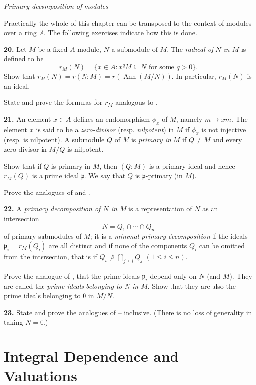 \medskip
\noindent\emph{Primary decomposition of modules}

Practically the whole of this chapter can be transposed to the context of
modules over a ring $A$.  The following exercises indicate how this is done.

\medskip
\noindent\textbf{20.} Let $M$ be a fixed $A$-module, $N$ a submodule of $M$.  The \emph{radical of $N$ in $M$} is
defined to be
\[
r_M(N)=\{x\in A:x^qM\subseteq N\text{ for some }q>0\}.
\]
Show that $r_M(N)=r(N:M)=r(\operatorname{Ann}(M/N))$.  In particular, $r_M(N)$ is an
ideal.

State and prove the formulas for $r_M$ analogous to .

\medskip
\noindent\textbf{21.} An element $x\in A$ defines an endomorphism $\phi_x$ of $M$, namely $m\longmapsto xm$.  The
element $x$ is said to be a \emph{zero-divisor} (resp. \emph{nilpotent}) in $M$ if $\phi_x$ is not injective
(resp. is nilpotent).  A submodule $Q$ of $M$ is \emph{primary in $M$} if $Q\ne M$ and every
zero-divisor in $M/Q$ is nilpotent.

Show that if $Q$ is primary in $M$, then $(Q:M)$ is a primary ideal and hence
$r_M(Q)$ is a prime ideal $\mathfrak p$.  We say that $Q$ is $\mathfrak p$-primary (in $M$).

Prove the analogues of  and .

\medskip
\noindent\textbf{22.} A \emph{primary decomposition of $N$ in $M$} is a representation of $N$ as an intersection
\[
N=Q_1\cap\cdots\cap Q_n
\]
of primary submodules of $M$; it is a \emph{minimal primary decomposition} if the ideals
$\mathfrak p_i=r_M(Q_i)$ are all distinct and if none of the components $Q_i$ can be omitted
from the intersection, that is if $Q_i\nsupseteq\bigcap_{j\ne i}Q_j$ $(1\leq i\leq n)$.

Prove the analogue of , that the prime ideals $\mathfrak p_i$ depend only on $N$
(and $M$).  They are called the \emph{prime ideals belonging to $N$ in $M$}.  Show that they
are also the prime ideals belonging to 0 in $M/N$.

\medskip
\noindent\textbf{23.} State and prove the analogues of -- inclusive.  (There is no loss of
generality in taking $N=0$.)

\section{Integral Dependence and Valuations}

